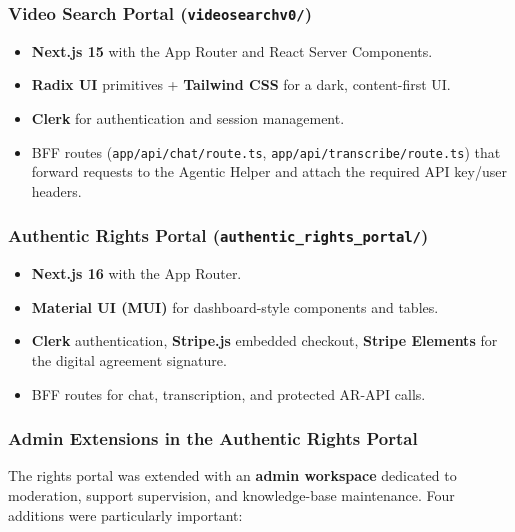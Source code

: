 \subsubsection{Video Search Portal (\texttt{videosearchv0/})}

\begin{itemize}
  \item \textbf{Next.js 15} with the App Router and React Server Components.
  \item \textbf{Radix UI} primitives + \textbf{Tailwind CSS} for a dark, content-first UI.
  \item \textbf{Clerk} for authentication and session management.
  \item BFF routes (\texttt{app/api/chat/route.ts}, \texttt{app/api/transcribe/route.ts}) that
    forward requests to the Agentic Helper and attach the required API key/user headers.
\end{itemize}

\subsubsection{Authentic Rights Portal (\texttt{authentic\_rights\_portal/})}

\begin{itemize}
  \item \textbf{Next.js 16} with the App Router.
  \item \textbf{Material UI (MUI)} for dashboard-style components and tables.
  \item \textbf{Clerk} authentication, \textbf{Stripe.js} embedded checkout,
    \textbf{Stripe Elements} for the digital agreement signature.
  \item BFF routes for chat, transcription, and protected AR-API calls.
\end{itemize}

\subsubsection{Admin Extensions in the Authentic Rights Portal}

The rights portal was extended with an \textbf{admin workspace} dedicated to moderation,
support supervision, and knowledge-base maintenance. Four additions were particularly important:

